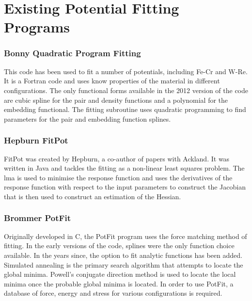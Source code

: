 

\section{Existing Potential Fitting Programs}
\label{section:fittingprograms}

\subsubsection{Bonny Quadratic Program Fitting}

This code has been used to fit a number of potentials, including Fe-Cr and W-Re.  It is a Fortran code and uses know properties of the material in different configurations.  The only functional forms available in the 2012 version of the code are cubic spline for the pair and density functions and a polynomial for the embedding functional.  The fitting subroutine uses quadratic programming to find parameters for the pair and embedding function splines.




\subsubsection{Hepburn FitPot}

FitPot was created by Hepburn, a co-author of papers with Ackland\cite{hepburnfec}.  It was written in Java and tackles the fitting as a non-linear least squares problem.  The \acrfull{lma} is used to minimise the response function and uses the derivatives of the response function with respect to the input parameters to construct the Jacobian that is then used to construct an estimation of the Hessian.


\subsubsection{Brommer PotFit}

Originally developed in C, the PotFit\cite{pbrommer} program uses the force matching method of fitting.  In the early versions of the code, splines were the only function choice available.  In the years since, the option to fit analytic functions has been added.  Simulated annealing is the primary search algorithm that attempts to locate the global minima.  Powell's conjugate direction method is used to locate the local minima once the probable global minima is located.  In order to use PotFit, a database of force, energy and stress for various configurations is required.


